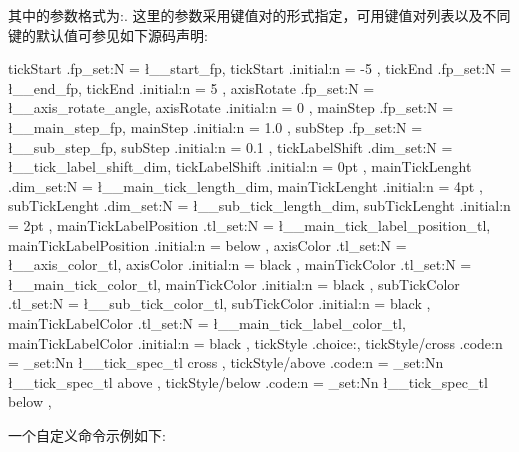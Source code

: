 其中\cmd{\ShowAxis}\index{\cmd{\ShowAxis}}的参数格式为:.
这里的参数采用键值对的形式指定，可用键值对列表以及不同键的默认值可参见如下源码声明:
\begin{codeprint}
tickStart       .fp_set:N   = \l__start_fp,
tickStart       .initial:n  = { -5 },
tickEnd         .fp_set:N   = \l__end_fp,
tickEnd         .initial:n  = { 5 },
axisRotate      .fp_set:N   = \l__axis_rotate_angle,
axisRotate      .initial:n  = { 0 },
mainStep        .fp_set:N   = \l__main_step_fp,
mainStep        .initial:n  = { 1.0 },
subStep         .fp_set:N   = \l__sub_step_fp,
subStep         .initial:n  = { 0.1 },
tickLabelShift  .dim_set:N  = \l__tick_label_shift_dim,
tickLabelShift  .initial:n  = { 0pt },
mainTickLenght  .dim_set:N  = \l__main_tick_length_dim,
mainTickLenght  .initial:n  = { 4pt },
subTickLenght   .dim_set:N  = \l__sub_tick_length_dim,
subTickLenght   .initial:n  = { 2pt },
mainTickLabelPosition .tl_set:N  = \l__main_tick_label_position_tl,
mainTickLabelPosition .initial:n = { below },
axisColor       .tl_set:N   = \l__axis_color_tl,
axisColor       .initial:n  = { black },
mainTickColor   .tl_set:N   = \l__main_tick_color_tl,
mainTickColor   .initial:n  = { black },
subTickColor    .tl_set:N   = \l__sub_tick_color_tl,
subTickColor    .initial:n  = { black },
mainTickLabelColor .tl_set:N  = \l__main_tick_label_color_tl,
mainTickLabelColor .initial:n = { black },
tickStyle       .choice:,
tickStyle/cross .code:n     = \tl_set:Nn \l__tick_spec_tl { cross },
tickStyle/above .code:n     = \tl_set:Nn \l__tick_spec_tl { above },
tickStyle/below .code:n     = \tl_set:Nn \l__tick_spec_tl { below },
\end{codeprint}

一个自定义\cmd{\ShowAxis}命令示例如下:
\begin{codeprint}
\end{codeprint}

